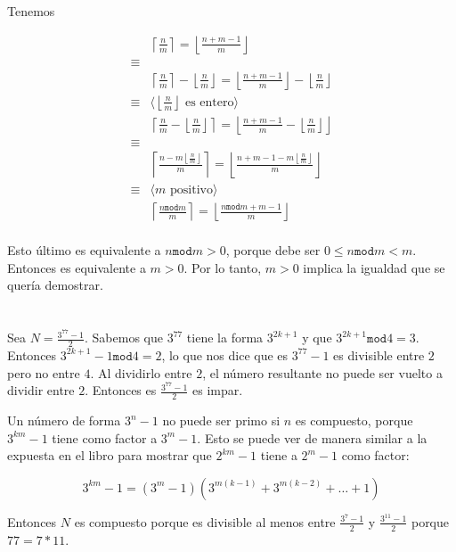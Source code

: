 \documentclass{article}
\newcommand{\piso}[1]{\left \lfloor #1 \right \rfloor}
\newcommand{\techo}[1]{\left \lceil #1 \right \rceil}
\begin{document}
\section{}

Tenemos

\begin{align*}
 & \techo{\frac{n}{m}} = \piso{\frac{n+m-1}{m}} \\
 \equiv & \\
 & \techo{\frac{n}{m}} - \piso{\frac{n}{m}} = \piso{\frac{n+m-1}{m}} - \piso{\frac{n}{m}} \\
 \equiv & \langle \piso{\frac{n}{m}} \text{ es entero} \rangle \\
 & \techo{\frac{n}{m} - \piso{\frac{n}{m}}} = \piso{\frac{n+m-1}{m} - \piso{\frac{n}{m}}} \\
 \equiv & \\
 & \techo{\frac{n - m\piso{\frac{n}{m}}}{m}} = \piso{\frac{n+m-1 - m\piso{\frac{n}{m}}}{m}} \\
 \equiv & \langle m \text{ positivo} \rangle \\
 & \techo{\frac{n \mathtt{mod} m}{m}} = \piso{\frac{n \mathtt{mod} m +m-1}{m}} \\
\end{align*}

Esto último es equivalente a $n \mathtt{mod} m > 0$, porque debe ser
$0 \leq n \mathtt{mod} m < m$.
Entonces es equivalente a $m > 0$. Por lo tanto, $m > 0$ implica la igualdad que se quería
demostrar.

\section{}

Sea $N = \frac{3^{77}-1}{2}$. Sabemos que $3^{77}$ tiene la forma
$3^{2k+1}$ y que $3^{2k+1} \mathtt{mod} 4 = 3$. Entonces
$3^{2k+1} - 1 \mathtt{mod} 4 = 2$, lo que nos dice que es $3^{77}-1$ es
divisible entre $2$ pero no entre $4$. Al dividirlo entre $2$, el número resultante
no puede ser vuelto a dividir entre $2$. Entonces es $\frac{3^{77}-1}{2}$ es impar.

Un número de forma $3^n-1$ no puede ser primo si $n$ es compuesto, porque
$3^{km}-1$ tiene como factor a $3^m-1$. Esto se puede ver de manera similar a
la expuesta en el libro para mostrar que $2^{km}-1$ tiene a $2^m-1$ como factor:

$$
3^{km}-1 = (3^m-1)(3^{m(k-1)}+3^{m(k-2)}+\ldots+1)
$$

Entonces $N$ es compuesto porque es divisible al menos entre $\frac{3^7-1}{2}$
y $\frac{3^{11}-1}{2}$ porque $77 = 7*11$.
\end{document}
